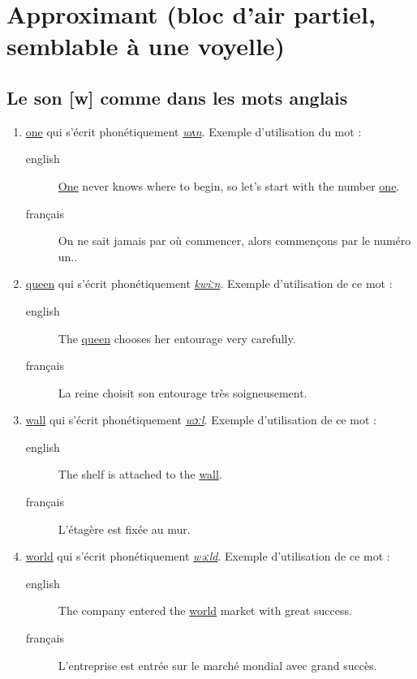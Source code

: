 \documentclass[12pt,a4paper]{book}
\begin{document}
\section{Approximant (bloc d'air partiel, semblable à une voyelle)}
\label{sec:org222f673}
\subsection{Le son [w] comme dans les mots anglais}
\label{sec:org6303a28}
\begin{enumerate}
\item \href{http://www.wordreference.com/enfr/one}{one} qui s'écrit phonétiquement \href{https://en.oxforddictionaries.com/definition/one}{\emph{wʌn}}. Exemple d'utilisation du
mot : 
\begin{description}
\item[{english}] \textenglish{\href{https://youtu.be/aSNJ00iAZ7I}{One} never knows where to begin, so let's start with
the number \href{https://youtu.be/jHRXlK2SnQ8}{one}.}
\item[{français}] On ne sait jamais par où commencer, alors commençons
par le numéro un..
\end{description}
\item \href{http://www.wordreference.com/enfr/queen}{queen} qui s'écrit phonétiquement \href{https://en.oxforddictionaries.com/definition/queen}{\emph{kwiːn}}. Exemple d'utilisation de
ce mot :
\begin{description}
\item[{english}] \textenglish{The \href{https://youtu.be/Jmd4OLzhQw0}{queen} chooses her entourage very carefully.}
\item[{français}] La reine choisit son entourage très soigneusement.
\end{description}
\item \href{http://www.wordreference.com/enfr/wall}{wall} qui s'écrit phonétiquement \href{https://en.oxforddictionaries.com/definition/wall}{\emph{wɔːl}}. Exemple d'utilisation de ce
mot : 
\begin{description}
\item[{english}] \textenglish{The shelf is attached to the \href{https://youtu.be/BN5Z28Dfl7o}{wall}.}
\item[{français}] L'étagère est fixée au mur.
\end{description}
\item \href{http://www.wordreference.com/enfr/world}{world} qui s'écrit phonétiquement \href{https://en.oxforddictionaries.com/definition/world}{\emph{wəːld}}. Exemple d'utilisation de
ce mot :
\begin{description}
\item[{english}] \textenglish{The company entered the \href{https://youtu.be/fzDft0DZRUw}{world} market with great
success.}
\item[{français}] L'entreprise est entrée sur le marché mondial avec
grand succès.
\end{description}
\end{enumerate}
\end{document}
